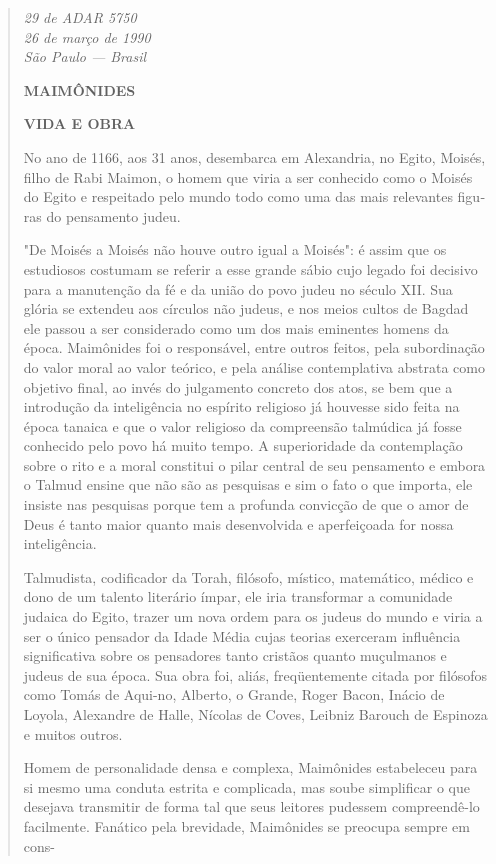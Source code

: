 \begin{quote}
\emph{29 de ADAR 5750\\
26 de março de 1990\\
São Paulo --- Brasil}

\textbf{MAIMÔNIDES}

\textbf{VIDA E OBRA}

No ano de 1166, aos 31 anos, desembarca em Alexandria, no Egito, Moisés,
filho de Rabi Maimon, o homem que viria a ser conhecido como o Moi­sés
do Egito e respeitado pelo mundo todo como uma das mais relevantes
figu­ras do pensamento judeu.

"De Moisés a Moisés não houve outro igual a Moisés": é assim que os
estudiosos costumam se referir a esse grande sábio cujo legado foi
decisivo para a manutenção da fé e da união do povo judeu no século XII.
Sua glória se extendeu aos círculos não judeus, e nos meios cultos de
Bagdad ele passou a ser considerado como um dos mais eminentes homens da
época. Maimôni­des foi o responsável, entre outros feitos, pela
subordinação do valor moral ao valor teórico, e pela análise
contemplativa abstrata como objetivo final, ao invés do julgamento
concreto dos atos, se bem que a introdução da inteligên­cia no espírito
religioso já houvesse sido feita na época tanaica e que o valor
religioso da compreensão talmúdica já fosse conhecido pelo povo há muito
tem­po. A superioridade da contemplação sobre o rito e a moral constitui
o pilar central de seu pensamento e embora o Talmud ensine que não são
as pesquisas e sim o fato o que importa, ele insiste nas pesquisas
porque tem a profunda convicção de que o amor de Deus é tanto maior
quanto mais desenvolvida e aperfeiçoada for nossa inteligência.

Talmudista, codificador da Torah, filósofo, místico, matemático, mé­dico
e dono de um talento literário ímpar, ele iria transformar a comunidade
judaica do Egito, trazer um nova ordem para os judeus do mundo e viria a
ser o único pensador da Idade Média cujas teorias exerceram influência
significati­va sobre os pensadores tanto cristãos quanto muçulmanos e
judeus de sua épo­ca. Sua obra foi, aliás, freqüentemente citada por
filósofos como Tomás de Aqui-no, Alberto, o Grande, Roger Bacon, Inácio
de Loyola, Alexandre de Halle, Ní­colas de Coves, Leibniz Barouch de
Espinoza e muitos outros.

Homem de personalidade densa e complexa, Maimônides estabele­ceu para si
mesmo uma conduta estrita e complicada, mas soube simplificar o que
desejava transmitir de forma tal que seus leitores pudessem
compreendê-lo facilmente. Fanático pela brevidade, Maimônides se
preocupa sempre em cons-


\end{quote}
